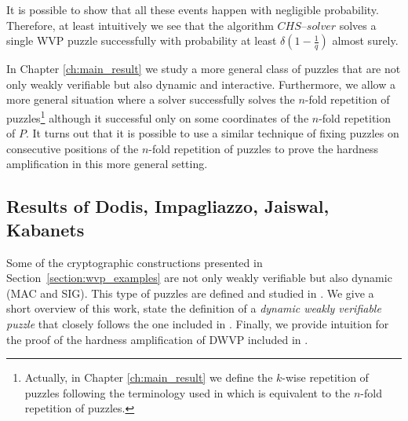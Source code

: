 It is possible to show that all these events happen with negligible probability.
Therefore, at least intuitively we see that the algorithm $\mathit{CHS\text{--}solver}$
solves a single WVP puzzle successfully with probability at least $\delta(1\!-\!\frac{1}{q})$ almost surely.

In Chapter \ref{ch:main_result} we study a more general class of puzzles that are not only weakly verifiable but also dynamic and interactive.
Furthermore, we allow a more general situation where a solver successfully solves the $n$-fold repetition of puzzles\footnote{Actually,
in Chapter \ref{ch:main_result} we define the $k$-wise repetition of puzzles following the terminology used in \cite{Dodis:2009:SAI:1530441.1530450}
which is equivalent to the $n$-fold repetition of puzzles.}
although it successful only on some coordinates of the $n$-fold repetition of $P$.
It turns out that it is possible to use a similar technique of fixing puzzles on consecutive positions of the $n$-fold repetition of
puzzles to prove the hardness amplification in this more general setting.
%
\subsection{Results of Dodis,  Impagliazzo,  Jaiswal,  Kabanets}
\label{subsec:dijk}
Some of the cryptographic constructions presented in Section~\ref{section:wvp_examples}
are not only weakly verifiable but also dynamic (MAC and SIG). This type of puzzles are defined and studied in \cite{Dodis:2009:SAI:1530441.1530450}.
We give a short overview of this work, state the definition of a \textit{dynamic weakly verifiable puzzle} that closely follows
the one included in \cite{Dodis:2009:SAI:1530441.1530450}. Finally, we provide intuition for the proof of the hardness amplification of DWVP
included in \cite{Dodis:2009:SAI:1530441.1530450}.

